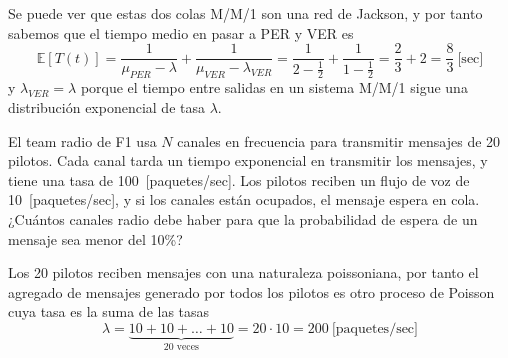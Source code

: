 \documentclass{upmassignment}
\begin{document}
\begin{problemlist}
\begin{solucion}
\begin{minipage}{\textwidth}
\end{minipage}
\vspace{1em}

Se puede ver que estas dos colas M/M/1
son una red de Jackson, y por tanto sabemos
que el tiempo medio en pasar a PER y VER es
\begin{equation*}
    \mathbb{E}[T(t)]=
    \frac{1}{\mu_{PER}-\lambda}
    +\frac{1}{\mu_{VER}-\lambda_{VER}}
    = \frac{1}{2-\frac{1}{2}}
    + \frac{1}{1-\frac{1}{2}}
    =\frac{2}{3}+2 = \frac{8}{3}~\text{[sec]}
\end{equation*}
y $\lambda_{VER}=\lambda$ porque el tiempo
entre salidas en un sistema M/M/1 sigue una
distribución exponencial de tasa $\lambda$.




    \end{solucion}


    \pbitem El team radio de F1
    usa $N$ canales en frecuencia para
    transmitir mensajes de 20 pilotos.
    Cada canal tarda un tiempo exponencial
    en transmitir los mensajes, y tiene
    una tasa de 100~[paquetes/sec].
    Los pilotos reciben un flujo de voz de
    10~[paquetes/sec], y si los canales 
    están ocupados, el mensaje espera en cola.
    ¿Cuántos canales radio debe haber para
    que la probabilidad de espera de un
    mensaje sea menor del 10\%?

    \begin{minipage}{\textwidth}
        \centering
        \resizebox{!}{.27\textwidth}{%
            
        }
    \end{minipage}

    \begin{solucion}
        Los 20 pilotos reciben mensajes con una
naturaleza poissoniana, por tanto el agregado
de mensajes generado por todos los pilotos
es otro proceso de Poisson cuya tasa
es la suma de las tasas
\begin{equation*}
    \lambda=\underbrace{10+10+\ldots+10}_{\text{20 veces}}=20\cdot10=200~\text{[paquetes/sec]}
\end{equation*}


\end{solucion}
\end{problemlist}
\end{document}

